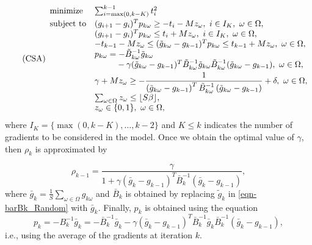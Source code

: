\documentclass[11pt,twoside]{article}
\begin{document}
\begin{equation}\label{form:csa}\tag{CSA}
\begin{array}{lll}
        \minimize{}  & \sum_{i=\max(0,k-K)}^{k-1} t_i^2  \\
         \subject     &
        (g_{i+1}- g_i)^T p_{k\omega} \ge -t_i - Mz_\omega,  \ i \in
        I_K, \ \omega \in \Omega,\\
       & (g_{i+1}- g_i)^T p_{k\omega} \le t_i + Mz_\omega, \ i \in
       I_K, \ \omega \in \Omega,\\
       & -t_{k-1}- Mz_\omega \le (\tilde{g}_{k\omega}- g_{k-1})^T
       p_{k\omega} \le t_{k-1} + Mz_\omega, \ \omega \in \Omega, \\
&p_{k\omega} =-\tilde B_{k\omega}^{-1}\tilde{g}_{k\omega} \\
&\phantom{p_{k\omega} =}
 -\gamma ( \tilde{g}_{k\omega} - g_{k-1} )^T\tilde B_{k\omega}^{-1}
 \tilde{g}_{k\omega}\tilde B_{k\omega}^{-1} ( \tilde{g}_{k\omega} -
 g_{k-1} ), \ \omega \in \Omega,\\[1mm]
&\disp \gamma + Mz_\omega \ge
  -\frac{1}{\left( \tilde{g}_{k\omega} - g_{k-1} \right)^T \tilde B_{k\omega}^{-1}\left( \tilde{g}_{k\omega} - g_{k-1}
    \right)} + \delta, \ \omega \in \Omega,\\
    & \sum_{\omega \in \Omega} z_\omega \leq \lfloor S\beta \rfloor,\\
            & z_\omega \in \{0,1\}, \ \omega \in \Omega,
\end{array}
\end{equation}
where $I_K = \{\max(0,k-K),\dots,k-2\}$ and $K \le k$ indicates the
number of gradients to be considered in the model. Once we obtain the
optimal value of $\gamma$, then $\rho_k$ is approximated by

\begin{equation}\label{eqn-rhocsa}
\rho_{k-1} =\frac{\gamma}{1+\gamma\left(\bar{g}_k - g_{k-1} \right)^T \bar{B}_k^{-1} \left(\bar{g}_k - g_{k-1} \right)},
\end{equation}
where $\bar{g}_k = \frac{1}{S}\sum_{\omega \in \Omega}g_{k\omega}$ and
$\bar{B}_k$ is obtained by replacing $\tilde{g}_k$ in
\eqref{eqn-barBk_Random} with $\bar{g}_k$. Finally, $p_k$ is obtained
using the equation
\begin{equation}\label{eqn-pkcsa}
p_k = -B_k^{-1}\bar{g}_k
 =-\bar B_k^{-1}\bar{g}_k - \gamma ( \bar{g}_k - g_{k-1})^T\bar B_k^{-1} \bar{g}_k \bar B_k^{-1}
 ( \bar{g}_k - g_{k-1} ),
\end{equation}
i.e., using the average of the gradients at iteration $k$.
\end{document}
